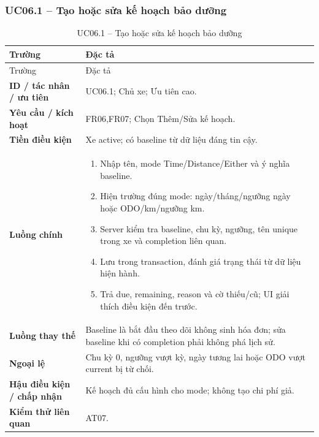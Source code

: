 \subsubsection{UC06.1 -- Tạo hoặc sửa kế hoạch bảo dưỡng}\label{uc:UC06.1}
\begin{smalltable}\begin{longtable}{L{3.2cm}L{11.8cm}}
\caption{UC06.1 -- Tạo hoặc sửa kế hoạch bảo dưỡng}\label{tab:UC06.1}\\
\toprule Trường & Đặc tả\\\midrule\endfirsthead
\toprule Trường & Đặc tả\\\midrule\endhead
\textbf{ID / tác nhân / ưu tiên} & UC06.1; Chủ xe; Ưu tiên cao.\\
\textbf{Yêu cầu / kích hoạt} & FR06,FR07; Chọn Thêm/Sửa kế hoạch.\\
\textbf{Tiền điều kiện} & Xe active; có baseline từ dữ liệu đáng tin cậy.\\
\textbf{Luồng chính} & \begin{enumerate}[leftmargin=*,nosep]
\item Nhập tên, mode Time/Distance/Either và ý nghĩa baseline.
\item Hiện trường đúng mode: ngày/tháng/ngưỡng ngày hoặc ODO/km/ngưỡng km.
\item Server kiểm tra baseline, chu kỳ, ngưỡng, tên unique trong xe và completion liên quan.
\item Lưu trong transaction, đánh giá trạng thái từ dữ liệu hiện hành.
\item Trả due, remaining, reason và cờ thiếu/cũ; UI giải thích điều kiện đến trước.
\end{enumerate}\\
\textbf{Luồng thay thế} & Baseline là bắt đầu theo dõi không sinh hóa đơn; sửa baseline khi có completion phải không phá lịch sử.\\
\textbf{Ngoại lệ} & Chu kỳ 0, ngưỡng vượt kỳ, ngày tương lai hoặc ODO vượt current bị từ chối.\\
\textbf{Hậu điều kiện / chấp nhận} & Kế hoạch đủ cấu hình cho mode; không tạo chi phí giả.\\
\textbf{Kiểm thử liên quan} & AT07.\\
\bottomrule\end{longtable}\end{smalltable}
